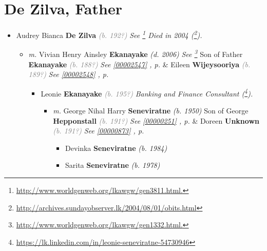 \documentclass[10pt, openany]{book}
\begin{document}
\chapter{De Zilva, Father}
\label{00002539}
\textcolor{slmaroon}{\textit{}}
\begin{itemize}
\item{Audrey Bianca  \textbf{De Zilva} \textcolor{gray}{\textit{(b. 192?)}} \textcolor{slmaroon}{\textit{See \footnote{\url{http://www.worldgenweb.org/lkawgw/gen3811.html.}}
Died in 2004 (\footnote{\url{http://archives.sundayobserver.lk/2004/08/01/obits.html}}).}}
\begin{itemize}
\item{\textit{m.} Vivian Henry Ainsley \textbf{Ekanayake} \textcolor{slorange}{\textit{(d. 2006)}} \textcolor{slmaroon}{\textit{See \footnote{\url{http://www.worldgenweb.org/lkawgw/gen1332.html.}}}} Son of  Father \textbf{Ekanayake} \textcolor{gray}{\textit{(b. 188?)}} \textcolor{slteal}{\textit{See  \autoref{00002547} \textit{, p. \pageref{00002547} }}}  \&  Eileen \textbf{Wijeysooriya} \textcolor{gray}{\textit{(b. 189?)}} \textcolor{slteal}{\textit{See  \autoref{00002548} \textit{, p. \pageref{00002548} }}}   \label{couple:00000167:00000198} \begin{itemize}
\item{Leonie \textbf{Ekanayake} \textcolor{gray}{\textit{(b. 195?)}} \textcolor{slmaroon}{\textit{Banking and Finance Consultant (\footnote{\url{https://lk.linkedin.com/in/leonie-seneviratne-54730946}}).}}
\begin{itemize}
\item{\textit{m.} George Nihal Harry \textbf{Seneviratne} \textcolor{slorange}{\textit{(b. 1950)}} Son of  George \textbf{Hepponstall} \textcolor{gray}{\textit{(b. 191?)}} \textcolor{slteal}{\textit{See  \autoref{00000251} \textit{, p. \pageref{00000251} }}}  \&  Doreen \textbf{Unknown} \textcolor{gray}{\textit{(b. 191?)}} \textcolor{slteal}{\textit{See  \autoref{00000873} \textit{, p. \pageref{00000873} }}}   \label{couple:00000197:00000822} \begin{itemize}
\item{Devinka \textbf{Seneviratne} \textcolor{slorange}{\textit{(b. 1984)}}
 }
\item{Sarita \textbf{Seneviratne} \textcolor{slorange}{\textit{(b. 1978)}}
 }
\end{itemize}}
\end{itemize}
 }

\end{itemize}}
\end{itemize}}
\end{itemize}
\end{document}
